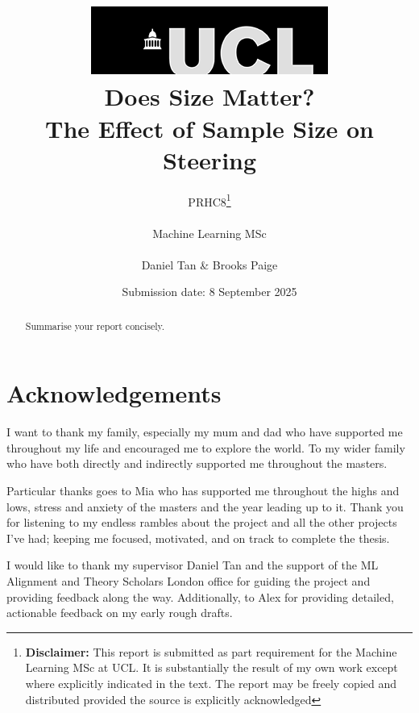 \documentclass[tikz, 12pt]{report}
\title{{ \includegraphics[scale=.5]{figures/ucl_logo.png}}\\
{{\Huge Does Size Matter?}\\{\Large The Effect of Sample Size on Steering}}\\
}
\date{Submission date: 8 September 2025}
\author{PRHC8\thanks{
{\bf Disclaimer:}
This report is submitted as part requirement for the Machine Learning MSc at UCL. It is
substantially the result of my own work except where explicitly indicated in the text.
The report may be freely copied and distributed provided the source is explicitly acknowledged}
\\ \\
Machine Learning MSc\\ \\
Daniel Tan \& Brooks Paige}
\begin{document}
\linenumbers





\onehalfspacing
\maketitle

\chapter*{Acknowledgements}

I want to thank my family, especially my mum and dad who have supported me throughout my life and encouraged me to explore the world.
To my wider family who have both directly and indirectly supported me throughout the masters.

Particular thanks goes to Mia who has supported me throughout the highs and lows, stress and anxiety of the masters and the year leading up to it.
Thank you for listening to my endless rambles about the project and all the other projects I've had; keeping me focused, motivated, and on track to complete the thesis.

I would like to thank my supervisor Daniel Tan and the support of the ML Alignment and Theory Scholars London office for guiding the project and providing feedback along the way.
Additionally, to Alex for providing detailed, actionable feedback on my early rough drafts.

\begin{abstract}
Summarise your report concisely.
\end{abstract}

\tableofcontents
\listoffigures
\listoftables
\clearpage
{}









\appendix
{}





\end{document}
